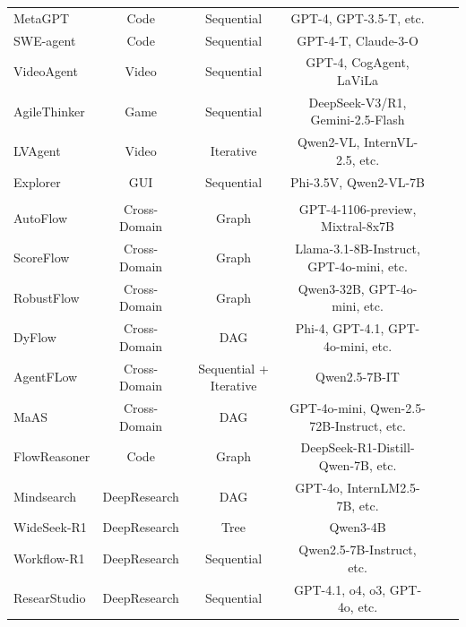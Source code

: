 \documentclass{llmxive}
\providecommand{\Yes}{\ding{51}}
\providecommand{\No}{\ding{55}}
\begin{document}
\begin{table}[htbp]
{\begin{tabular}{lccccc}
MetaGPT \cite{METAGPT} & Code & Sequential & GPT-4, GPT-3.5-T, etc. & \No & \Yes \\
SWE-agent \cite{SWE_agent} & Code & Sequential & GPT-4-T, Claude-3-O & \No & \No \\
VideoAgent \cite{VideoAgent} & Video & Sequential & GPT-4, CogAgent, LaViLa & \No & \No \\
AgileThinker \cite{AgileThinker} & Game & Sequential & DeepSeek-V3/R1, Gemini-2.5-Flash & \No & \No \\
LVAgent \cite{LVAgent} & Video & Iterative & Qwen2-VL, InternVL-2.5, etc. & \Yes & \No \\
Explorer \cite{Explorer} & GUI & Sequential & Phi-3.5V, Qwen2-VL-7B & \Yes & \Yes \\
\midrule
\rowcolor{gray!10!white} 
\multicolumn{6}{c}{\textbf{\textit{Automated Workflow (\cref{sec:automated_workflow})}}} \\
AutoFlow \cite{AutoFlow} & Cross-Domain & Graph & GPT-4-1106-preview, Mixtral-8x7B & \Yes & \Yes \\
ScoreFlow \cite{ScoreFlow} & Cross-Domain & Graph & Llama-3.1-8B-Instruct, GPT-4o-mini, etc. & \Yes & \Yes \\
RobustFlow \cite{RobustFlow} & Cross-Domain & Graph & Qwen3-32B, GPT-4o-mini, etc. & \Yes & \Yes \\
DyFlow \cite{DyFlow} & Cross-Domain & DAG & Phi-4, GPT-4.1, GPT-4o-mini, etc. & \Yes & \Yes \\
AgentFLow \cite{AgentFlow} & Cross-Domain & Sequential + Iterative & Qwen2.5-7B-IT & \Yes & \Yes \\
MaAS \cite{MaAS} & Cross-Domain & DAG & GPT-4o-mini, Qwen-2.5-72B-Instruct, etc. & \Yes & \Yes \\
FlowReasoner \cite{FlowReasoner} & Code & Graph & DeepSeek-R1-Distill-Qwen-7B, etc. & \Yes & \Yes \\
Mindsearch \cite{Mindsearch} & DeepResearch & DAG & GPT-4o, InternLM2.5-7B, etc. & \No & \Yes \\
WideSeek-R1 \cite{wideseek_r1} & DeepResearch & Tree & Qwen3-4B & \Yes & \Yes \\
Workflow-R1 \cite{Workflow_R1} & DeepResearch & Sequential & Qwen2.5-7B-Instruct, etc. & \Yes & \Yes \\
ResearStudio \cite{ResearStudio} & DeepResearch & Sequential & GPT-4.1, o4, o3, GPT-4o, etc. & \No & \No \\

\end{tabular}}
\end{table}
\end{document}
